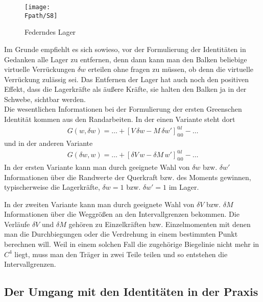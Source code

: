 \begin{figure}[tbp]
\centering
\if {} \sidecaption \fi
\texttt{[image: \\Fpath/S8]}
\caption{Federndes Lager} \label{S8}
%
\end{figure}%


Im Grunde empfiehlt es sich sowieso, vor der Formulierung der Identit\"{a}ten in Gedanken alle Lager zu entfernen, denn dann kann man den Balken beliebige virtuelle Verr\"{u}ckungen $\delta w$ erteilen ohne  fragen zu m\"{u}ssen, ob denn die virtuelle Verr\"{u}ckung zul\"{a}ssig sei. Das Entfernen der Lager hat auch noch den positiven Effekt, dass die Lagerkr\"{a}fte als \"{a}u{\ss}ere Kr\"{a}fte, sie halten den Balken ja in  der Schwebe, sichtbar werden.
\\

Die wesentlichen Informationen bei der Formulierung der ersten Greenschen Identit\"{a}t kommen aus den Randarbeiten. In der einen Variante steht dort
\begin{align}
G(w, \delta w) = \ldots + [V\,\delta w - M\,\delta w']_{@0}^{@l} - \ldots
\end{align}
und in der anderen Variante
\begin{align}
G(\delta w, w) = \ldots + [\delta V\, w - \delta M\, w']_{@0}^{@l} - \ldots
\end{align}
In der ersten Variante kann man durch geeignete Wahl von $\delta w$ bzw. $\delta w'$ Informationen \"{u}ber die Randwerte der Querkraft bzw. des Moments gewinnen, typischerweise die Lagerkr\"{a}fte, $\delta w = 1$ bzw. $\delta w' = 1$ im Lager.

In der zweiten Variante kann man durch geeignete Wahl von $\delta V $ bzw. $\delta M $ Informationen \"{u}ber die Weggr\"{o}{\ss}en an den Intervallgrenzen bekommen. Die Verl\"{a}ufe $\delta V$ und $\delta M$ geh\"{o}ren zu Einzelkr\"{a}ften bzw. Einzelmomenten mit denen man die Durchbiegungen oder die Verdrehung in einem bestimmten Punkt berechnen will. Weil in einem solchen Fall die zugeh\"{o}rige Biegelinie nicht mehr in $C^4 $ liegt, muss man den Tr\"{a}ger in zwei Teile teilen und so entstehen die Intervallgrenzen.


\subsection{Der Umgang mit den Identit\"{a}ten in der Praxis}

